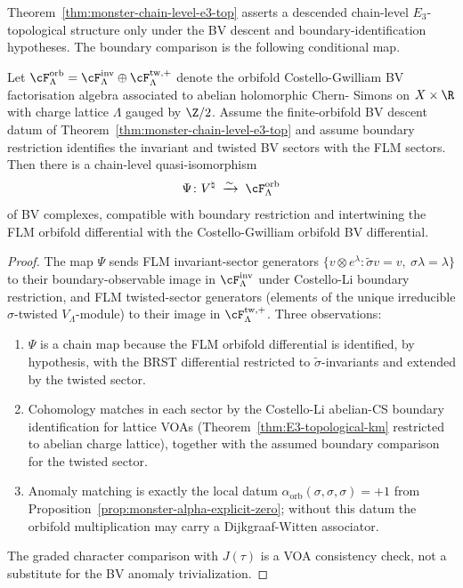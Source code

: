Theorem~\ref{thm:monster-chain-level-e3-top} asserts a descended
chain-level $E_3$-topological structure only under the BV descent and
boundary-identification hypotheses. The boundary comparison is the
following conditional map.

\begin{proposition}
\label{prop:monster-flm-chain-qi}
Let $\cF_\Lambda^{\mathrm{orb}} = \cF_\Lambda^{\mathrm{inv}} \oplus
\cF_\Lambda^{\mathrm{tw},+}$ denote the orbifold Costello-Gwilliam
BV factorisation algebra associated to abelian holomorphic Chern-
Simons on $X \times \R$ with charge lattice $\Lambda$ gauged by
$\Z/2$. Assume the finite-orbifold BV descent datum of
Theorem~\ref{thm:monster-chain-level-e3-top} and assume boundary
restriction identifies the invariant and twisted BV sectors with the
FLM sectors. Then there is a chain-level quasi-isomorphism
\[
 \Psi\colon V^\natural
 \;\xrightarrow{\sim}\;
 \cF_\Lambda^{\mathrm{orb}}
\]
of BV complexes, compatible with boundary restriction and intertwining
the FLM orbifold differential with the Costello-Gwilliam orbifold
BV differential.
\end{proposition}

\begin{proof}
The map $\Psi$ sends FLM invariant-sector generators
$\{v \otimes e^\lambda : \widetilde{\sigma} v = v,\ \sigma\lambda =
\lambda\}$ to their boundary-observable image in
$\cF_\Lambda^{\mathrm{inv}}$ under Costello-Li boundary restriction,
and FLM twisted-sector generators (elements of the unique irreducible
$\sigma$-twisted $V_\Lambda$-module) to their image in
$\cF_\Lambda^{\mathrm{tw},+}$. Three observations:
\begin{enumerate}[label=\textup{(\roman*)}]
\item $\Psi$ is a chain map because the FLM orbifold differential is
identified, by hypothesis, with the BRST differential restricted to
$\widetilde{\sigma}$-invariants and extended by the twisted sector.
\item Cohomology matches in each sector by the Costello-Li
abelian-CS boundary identification for lattice VOAs
(Theorem~\ref*{thm:E3-topological-km} restricted to abelian charge
lattice), together with the assumed boundary comparison for the
twisted sector.
\item Anomaly matching is exactly the local datum
$\alpha_{\mathrm{orb}}(\sigma,\sigma,\sigma)=+1$ from
Proposition~\ref{prop:monster-alpha-explicit-zero}; without this
datum the orbifold multiplication may carry a Dijkgraaf-Witten
associator.
\end{enumerate}
The graded character comparison with $J(\tau)$ is a VOA consistency
check, not a substitute for the BV anomaly trivialization.
\end{proof}

